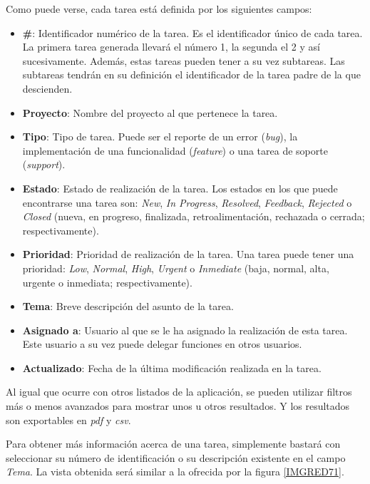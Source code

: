 \documentclass[11pt,a4paper,spanish,twoside]{report}
\begin{document}
	Como puede verse, cada tarea está definida por los siguientes campos:
	\begin{itemize}
	\item \textbf{\#}: Identificador numérico de la tarea. Es el identificador
	único de cada tarea. La primera tarea generada llevará el número 1, la
	segunda el 2 y así sucesivamente. Además, estas tareas pueden tener a su
	vez subtareas. Las subtareas tendrán en su definición el identificador de la
	tarea	padre de la que descienden.
	\item \textbf{Proyecto}: Nombre del proyecto al que pertenece la tarea.
	\item \textbf{Tipo}: Tipo de tarea. Puede ser el reporte de un error
	(\emph{bug}),	la implementación de una funcionalidad (\emph{feature}) o una
	tarea de soporte (\emph{support}).
	\item \textbf{Estado}: Estado de realización de la tarea. Los estados en
	los que puede encontrarse una tarea son: \emph{New}, \emph{In Progress},
	\emph{Resolved}, \emph{Feedback}, \emph{Rejected} o \emph{Closed} (nueva,
	en progreso, finalizada, retroalimentación, rechazada o cerrada;
	respectivamente).
	\item \textbf{Prioridad}: Prioridad de realización de la tarea. Una tarea
	puede tener una prioridad: \emph{Low}, \emph{Normal}, \emph{High},
	\emph{Urgent} o \emph{Inmediate} (baja, normal, alta, urgente o inmediata;
	respectivamente).
	\item \textbf{Tema}: Breve descripción del asunto de la tarea.
	\item \textbf{Asignado a}: Usuario al que se le ha asignado la realización
	de esta tarea. Este usuario a su vez puede delegar funciones en otros
	usuarios.
	\item \textbf{Actualizado}: Fecha de la última modificación realizada en la
	tarea.
	\end{itemize}

	Al igual que ocurre con otros listados de la aplicación, se pueden utilizar
	filtros más o menos avanzados para mostrar unos u otros resultados. Y los
	resultados son exportables en \emph{pdf} y \emph{csv}.

	Para obtener más información acerca de una tarea, simplemente bastará con
	seleccionar su número de identificación o su descripción existente en el
	campo \emph{Tema}. La vista obtenida será similar a la ofrecida por la
	figura \ref{IMGRED71}.

\end{document}
